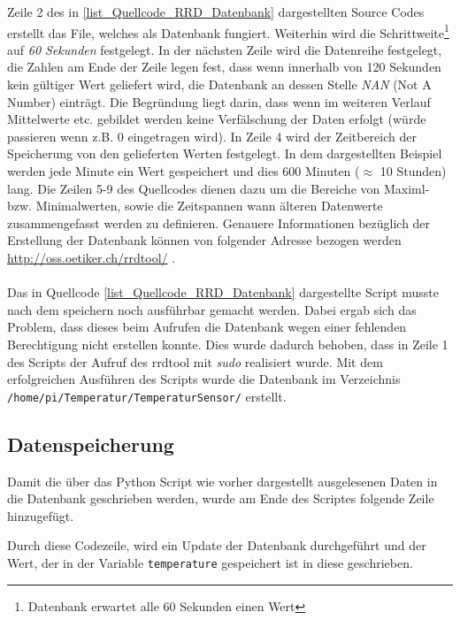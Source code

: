 Zeile 2 des in \ref{list_Quellcode_RRD_Datenbank} dargestellten Source Codes erstellt das File, welches als Datenbank fungiert. Weiterhin wird die Schrittweite\footnote{Datenbank erwartet alle 60 Sekunden einen Wert} auf \textit{60 Sekunden} festgelegt. In der nächsten Zeile wird die Datenreihe festgelegt, die Zahlen am Ende der Zeile legen fest, dass wenn innerhalb von 120 Sekunden kein gültiger Wert geliefert wird, die Datenbank an dessen Stelle \textit{NAN} (Not A Number) einträgt. Die Begründung liegt darin, dass wenn im weiteren Verlauf Mittelwerte etc. gebildet werden keine Verfälschung der Daten erfolgt (würde passieren wenn z.B. 0 eingetragen wird). In Zeile 4 wird der Zeitbereich der Speicherung von den gelieferten Werten festgelegt. In dem dargestellten Beispiel werden jede Minute ein Wert gespeichert und dies 600 Minuten ($\approx$ 10 Stunden) lang. Die Zeilen 5-9 des Quellcodes dienen dazu um die Bereiche von Maximl- bzw. Minimalwerten, sowie die Zeitspannen wann älteren Datenwerte zusammengefasst werden zu definieren. Genauere Informationen bezüglich der Erstellung der Datenbank können von folgender Adresse bezogen werden \url{http://oss.oetiker.ch/rrdtool/} \citep{Hompage_RRDtool}.\\\\
Das in Quellcode \ref{list_Quellcode_RRD_Datenbank} dargestellte Script musste nach dem speichern noch ausführbar gemacht werden. Dabei ergab sich das Problem, dass dieses beim Aufrufen die Datenbank wegen einer fehlenden Berechtigung nicht erstellen konnte. Dies wurde dadurch behoben, dass in Zeile 1 des Scripts der Aufruf des rrdtool mit \textit{sudo} realisiert wurde. Mit dem erfolgreichen Ausführen des Scripts wurde die Datenbank im Verzeichnis \texttt{/home/pi/Temperatur/TemperaturSensor/} erstellt.

\subsection*{Datenspeicherung}
\label{subsection_Speicherung der Daten des DS18S20}
Damit die über das Python Script wie vorher dargestellt ausgelesenen Daten in die Datenbank geschrieben werden, wurde am Ende des Scriptes folgende Zeile hinzugefügt.



Durch diese Codezeile, wird ein Update der Datenbank durchgeführt und der Wert, der in der Variable \texttt{temperature} gespeichert ist in diese geschrieben.
\newpage

